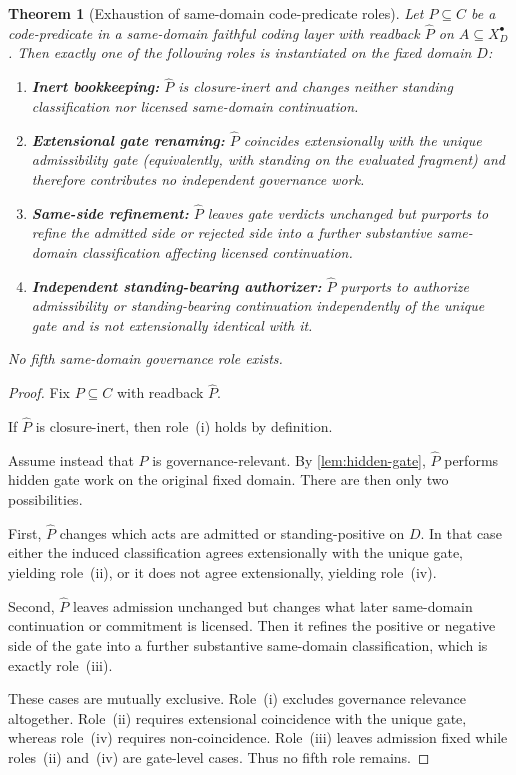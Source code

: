 \documentclass[11pt]{article}
\theoremstyle{plain}
\newtheorem{theorem}{Theorem}[section]
\theoremstyle{definition}
\newcommand{\Eval}{X_D^{\bullet}}
\newcommand{\domain}{D}
\begin{document}
\begin{theorem}[Exhaustion of same-domain code-predicate roles]
\label{thm:code-role-exhaustion}
Let $P\subseteq C$ be a code-predicate in a same-domain faithful coding layer with readback $\widehat P$ on $A\subseteq \Eval$. Then exactly one of the following roles is instantiated on the fixed domain $\domain$:
\begin{enumerate}[label=(\roman*), leftmargin=2.5em]
    \item \textbf{Inert bookkeeping:} $\widehat P$ is closure-inert and changes neither standing classification nor licensed same-domain continuation.
    \item \textbf{Extensional gate renaming:} $\widehat P$ coincides extensionally with the unique admissibility gate (equivalently, with standing on the evaluated fragment) and therefore contributes no independent governance work.
    \item \textbf{Same-side refinement:} $\widehat P$ leaves gate verdicts unchanged but purports to refine the admitted side or rejected side into a further substantive same-domain classification affecting licensed continuation.
    \item \textbf{Independent standing-bearing authorizer:} $\widehat P$ purports to authorize admissibility or standing-bearing continuation independently of the unique gate and is not extensionally identical with it.
\end{enumerate}
No fifth same-domain governance role exists.
\end{theorem}

\begin{proof}
Fix $P\subseteq C$ with readback $\widehat P$.

If $\widehat P$ is closure-inert, then role~(i) holds by definition.

Assume instead that $\widehat P$ is governance-relevant. By \cref{lem:hidden-gate}, $\widehat P$ performs hidden gate work on the original fixed domain. There are then only two possibilities.

First, $\widehat P$ changes which acts are admitted or standing-positive on $\domain$. In that case either the induced classification agrees extensionally with the unique gate, yielding role~(ii), or it does not agree extensionally, yielding role~(iv).

Second, $\widehat P$ leaves admission unchanged but changes what later same-domain continuation or commitment is licensed. Then it refines the positive or negative side of the gate into a further substantive same-domain classification, which is exactly role~(iii).

These cases are mutually exclusive. Role~(i) excludes governance relevance altogether. Role~(ii) requires extensional coincidence with the unique gate, whereas role~(iv) requires non-coincidence. Role~(iii) leaves admission fixed while roles~(ii) and~(iv) are gate-level cases. Thus no fifth role remains.
\end{proof}
\end{document}
